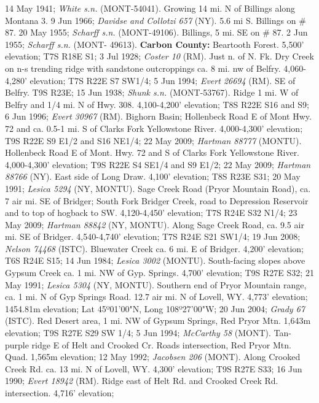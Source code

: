 14 May 1941; \textit{White s.n.} (MONT-54041).
Growing 14 mi. N of Billings along Montana 3. 9 Jun 1966;
\textit{Davidse and Collotzi 657} (NY).
5.6 mi S. Billings on \# 87. 20 May 1955; \textit{Scharff s.n.} (MONT-49106).
Billings, 5 mi. SE on \# 87. 2 Jun 1955; \textit{Scharff s.n.} (MONT- 49613).
  \textbf{Carbon County:}
Beartooth Forest. 5,500' elevation; T7S R18E S1; 3 Jul 1928;
\textit{Coster 10} (RM).
Just n. of N. Fk. Dry Creek on n-s trending ridge with sandstone outcroppings
ca. 8 mi. nw of Belfry. 4,060-4,280' elevation; T7S R22E S7 SW1/4; 5 Jun 1994;
\textit{Evert 26694} (RM).
SE of Belfry. T9S R23E; 15 Jun 1938; \textit{Shunk s.n.} (MONT-53767).
Ridge 1 mi. W of Belfry and 1/4 mi. N of Hwy. 308. 4,100-4,200' elevation;
T8S R22E S16 and S9; 6 Jun 1996; \textit{Evert 30967} (RM).
Bighorn Basin; Hollenbeck Road E of Mont Hwy. 72 and ca. 0.5-1 mi. S of Clarks
Fork Yellowstone River. 4,000-4,300' elevation; T9S R22E S9 E1/2 and S16 NE1/4;
22 May 2009; \textit{Hartman 88777} (MONTU).
Hollenbeck Road E of Mont. Hwy. 72 and S of Clarks Fork Yellowstone River.
4,000-4,300' elevation; T9S R22E S4 SE1/4 and S9 E1/2; 22 May 2009;
\textit{Hartman 88766} (NY).
East side of Long Draw. 4,100' elevation; T8S R23E S31; 20 May 1991;
\textit{Lesica 5294} (NY, MONTU).
Sage Creek Road (Pryor Mountain Road), ca. 7 air mi. SE of Bridger; South Fork
Bridger Creek, road to Depression Reservoir and to top of hogback to SW.
4,120-4,450' elevation; T7S R24E S32 N1/4; 23 May 2009;
\textit{Hartman 88842} (NY, MONTU).
Along Sage Creek Road, ca. 9.5 air mi. SE of Bridger. 4,540-4,740' elevation;
T7S R24E S21 SW1/4; 19 Jun 2008; \textit{Nelson 74468} (ISTC).
Bluewater Creek ca. 6 mi. E of Bridger. 4,200' elevation; T6S R24E S15;
14 Jun 1984; \textit{Lesica 3002} (MONTU).
South-facing slopes above Gypsum Creek ca. 1 mi. NW of Gyp. Springs.
4,700' elevation; T9S R27E S32; 21 May 1991; \textit{Lesica 5304} (NY, MONTU).
Southern end of Pryor Mountain range, ca. 1 mi. N of Gyp Springs Road. 12.7 air
mi. N of Lovell, WY. 4,773' elevation; 1454.81m elevation;
Lat 45º01'00"N, Long 108º27'00"W; 20 Jun 2004; \textit{Grady 67} (ISTC).
Red Desert area, 1 mi. NW of Gypsum Springs, Red Pryor Mtn. 1,643m elevation;
T9S R27E S29 SW 1/4; 5 Jun 1994; \textit{McCarthy 58} (MONT).
Tan-purple ridge E of Helt and Crooked Cr. Roads intersection, Red Pryor Mtn.
Quad. 1,565m elevation; 12 May 1992; \textit{Jacobsen 206} (MONT).
Along Crooked Creek Rd. ca. 13 mi. N of Lovell, WY. 4,300' elevation;
T9S R27E S33; 16 Jun 1990; \textit{Evert 18942} (RM).
Ridge east of Helt Rd. and Crooked Creek Rd. intersection. 4,716' elevation;
